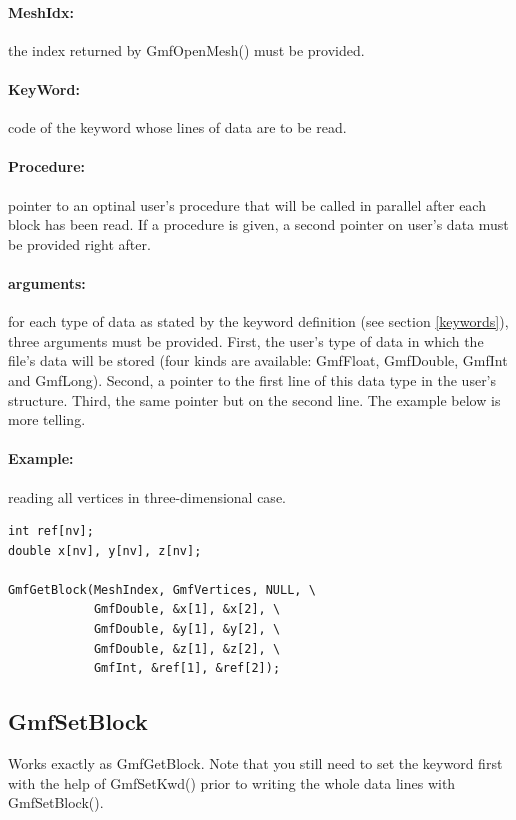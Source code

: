 \documentclass[a4paper,12pt]{article}
\begin{document}
\paragraph{MeshIdx:}
the index returned by GmfOpenMesh() must be provided.

\paragraph{KeyWord:} code of the keyword whose lines of data are to be read.

\paragraph{Procedure:} pointer to an optinal user's procedure that will be called in  parallel after each block has been read. If a procedure is given, a second pointer on user's data must be provided right after.

\paragraph{arguments:} for each type of data as stated by the keyword definition (see section \ref{keywords}), three arguments must be provided. First, the user's type of data in which the file's data will be stored (four kinds are available: GmfFloat, GmfDouble, GmfInt and GmfLong). Second, a pointer to the first line of this data type in the user's structure. Third, the same pointer but on the second line. The example below is more telling.

\paragraph{Example:} reading all vertices in three-dimensional case.

\begin{tt}
\begin{verbatim}
int ref[nv];
double x[nv], y[nv], z[nv];

GmfGetBlock(MeshIndex, GmfVertices, NULL, \
            GmfDouble, &x[1], &x[2], \
            GmfDouble, &y[1], &y[2], \
            GmfDouble, &z[1], &z[2], \
            GmfInt, &ref[1], &ref[2]);
\end{verbatim}
\end{tt}
\normalfont


\subsection{GmfSetBlock}
Works exactly as GmfGetBlock. Note that you still need to set the keyword first with the help of GmfSetKwd() prior to writing the whole data lines with GmfSetBlock().
\end{document}
